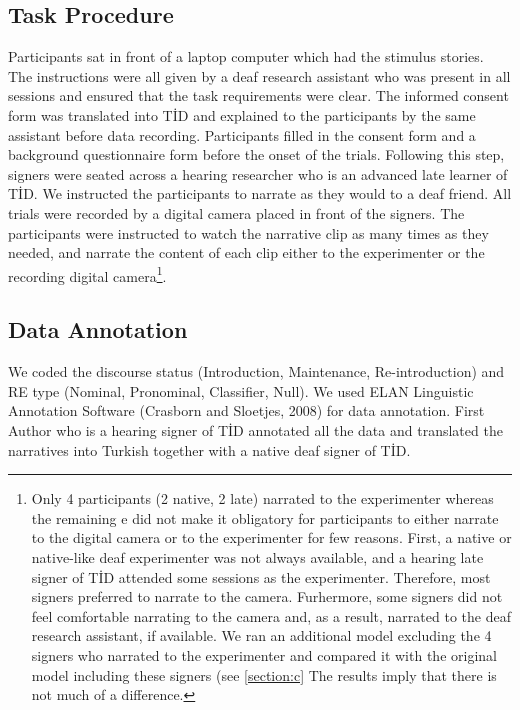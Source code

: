 \documentclass[]{elsarticle} %
\begin{document}
\hypertarget{task-procedure}{%
\subsection{Task Procedure}\label{task-procedure}}

Participants sat in front of a laptop computer which had the stimulus
stories. The instructions were all given by a deaf research assistant
who was present in all sessions and ensured that the task requirements
were clear. The informed consent form was translated into TİD and
explained to the participants by the same assistant before data
recording. Participants filled in the consent form and a background
questionnaire form before the onset of the trials. Following this step,
signers were seated across a hearing researcher who is an advanced late
learner of TİD. We instructed the participants to narrate as they would
to a deaf friend. All trials were recorded by a digital camera placed in
front of the signers. The participants were instructed to watch the
narrative clip as many times as they needed, and narrate the content of
each clip either to the experimenter or the recording digital
camera\footnote{Only 4 participants (2 native, 2 late) narrated to the experimenter whereas the remaining e did not make it obligatory for participants to either narrate to the digital camera or to the experimenter for few reasons. First, a native or native-like deaf experimenter was not always available, and a hearing late signer of TİD attended some sessions as the experimenter. Therefore, most signers preferred to narrate to the camera. Furhermore, some signers did not feel comfortable narrating to the camera and, as a result, narrated to the deaf research assistant, if available. We ran an additional model excluding the 4 signers who narrated to the experimenter and compared it with the original model including these signers (see \ref{section:c} The results imply that there is not much of a difference.}.

\hypertarget{data-annotation}{%
\subsection{Data Annotation}\label{data-annotation}}

We coded the discourse status (Introduction, Maintenance,
Re-introduction) and RE type (Nominal, Pronominal, Classifier, Null). We
used ELAN Linguistic Annotation Software (Crasborn and Sloetjes, 2008)
for data annotation. First Author who is a hearing signer of TİD
annotated all the data and translated the narratives into Turkish
together with a native deaf signer of TİD.
\end{document}
